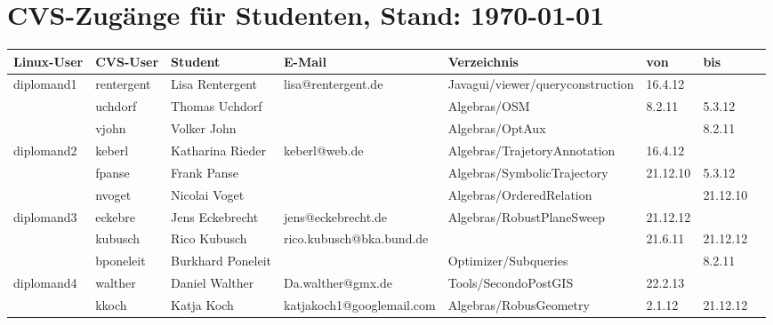 \documentclass[a4paper,9pt,landscape]{scrartcl}
\begin{document}
\section{CVS-Zug\"ange f\"ur Studenten, Stand: \today}
\begin{longtable}{|l|l|l|l|l|l|l|l|}
  \hline \hline
\textbf{Linux-User}        &\textbf{CVS-User}        &\textbf{Student}&\textbf{E-Mail}   &\textbf{Verzeichnis}            &\textbf{von}&\textbf{bis}\\
\hline
\hline
\rowcolor{yellow}\cellcolor{green}diplomand1 &rentergent&Lisa Rentergent &lisa@rentergent.de&Javagui/viewer/queryconstruction&16.4.12     &\\
\cline{2-7}
\cellcolor{green}           &uchdorf                  &Thomas Uchdorf  &                  &Algebras/OSM                    &8.2.11      &5.3.12\\
\cline{2-7}
\cellcolor{green}           &vjohn                    &Volker John     &                  &Algebras/OptAux                 &            &8.2.11\\
\hline
\hline
\rowcolor{yellow}\cellcolor{green}diplomand2 & keberl    &Katharina Rieder&keberl@web.de&Algebras/TrajetoryAnnotation                       &16.4.12     &\\
\cline{2-7}
\cellcolor{green}           &fpanse                   &Frank Panse     &                  &Algebras/SymbolicTrajectory     &21.12.10    &5.3.12\\
\cline{2-7}
\cellcolor{green}           &nvoget                   &Nicolai Voget   &                  &Algebras/OrderedRelation        &            &21.12.10\\
\hline
\hline
\rowcolor{yellow}\cellcolor{red}diplomand3   & eckebre   &Jens Eckebrecht &jens@eckebrecht.de&Algebras/RobustPlaneSweep       &21.12.12    & \\
\cline{2-7}
\cellcolor{red}             &kubusch                  &Rico Kubusch    &rico.kubusch@bka.bund.de&                          &21.6.11     &21.12.12\\
\cline{2-7}
\cellcolor{red}             &bponeleit                &Burkhard Poneleit&                  &Optimizer/Subqueries           &            &8.2.11\\
\hline
\hline
\rowcolor{yellow}\cellcolor{red}diplomand4   & walther   &Daniel Walther  &Da.walther@gmx.de &Tools/SecondoPostGIS            &22.2.13     &\\
\cline{2-7}
\cellcolor{red}             &kkoch                    &Katja Koch      &katjakoch1@googlemail.com&Algebras/RobusGeometry   &2.1.12      &21.12.12\\

\end{longtable}
\end{document}
